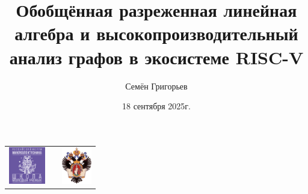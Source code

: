 \documentclass[xcolor=table,aspectratio=169]{beamer}
\title[Разреженная линейная алгебра: зачем и как]{Обобщённая разреженная линейная алгебра и высокопроизводительный анализ графов в экосистеме RISC-V}
\institute[СПбГУ]{
Санкт-Петербургский Государственный Университет
}
\author[Семён Григорьев]{Семён Григорьев}
\date{18 сентября 2025г.}
\begin{document}
{
\begin{frame}[fragile]
  \begin{table}
  \centering
  \begin{tabularx}{\linewidth}{XcX}
    \includegraphics[height=1.6cm]{pictures/YRS.pdf} \hfill
    & 
    & \hfill \includegraphics[height=1.6cm]{pictures/SPbGU_Logo.png}
  \end{tabularx}
  \end{table}
  \titlepage
\end{frame}
}
\end{document}
